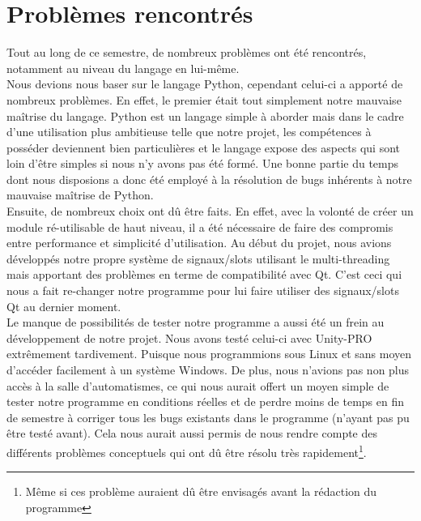 {\section{Problèmes rencontrés}

Tout au long de ce semestre, de nombreux problèmes ont été rencontrés, notamment au niveau du langage en lui-même. \\
Nous devions nous baser sur le langage Python, cependant celui-ci a apporté de nombreux problèmes.
\newline
En effet, le premier était tout simplement notre mauvaise maîtrise du langage. Python est un langage simple à aborder mais dans le cadre d'une utilisation plus ambitieuse telle que notre projet, les compétences à posséder deviennent bien particulières et le langage expose des aspects qui sont loin d'être simples si nous n'y avons pas été formé. \newline
Une bonne partie du temps dont nous disposions a donc été employé à la résolution de bugs inhérents à notre mauvaise maîtrise de Python.\\



Ensuite, de nombreux choix ont dû être faits. En effet, avec la volonté de créer un module ré-utilisable de haut niveau, il a été nécessaire de faire des compromis entre performance et simplicité d'utilisation.\newline
Au début du projet, nous avions développés notre propre système de signaux/slots utilisant le multi-threading mais apportant des problèmes en terme de compatibilité avec Qt. C'est ceci qui nous a fait re-changer notre programme pour lui faire utiliser des signaux/slots Qt au dernier moment.\\



Le manque de possibilités de tester notre programme a aussi été un frein au développement de notre projet. Nous avons testé celui-ci avec Unity-PRO extrêmement tardivement.\newline
Puisque nous programmions sous Linux et sans moyen d'accéder facilement à un système Windows.\newline
De plus, nous n'avions pas non plus accès à la salle d'automatismes, ce qui nous aurait offert un moyen simple de tester notre programme en conditions réelles et de perdre moins de temps en fin de semestre à corriger tous les bugs existants dans le programme (n'ayant pas pu être testé avant). Cela nous aurait aussi permis de nous rendre compte des différents problèmes conceptuels qui ont dû être résolu très rapidement\footnote{Même si ces problème auraient dû être envisagés avant la rédaction du programme}.


}

